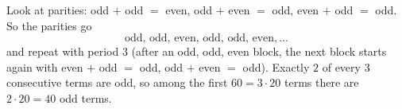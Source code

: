 Look at parities: odd $+$ odd $=$ even, odd $+$ even $=$ odd, even $+$ odd $=$ odd. So the parities go
\[
\text{odd, odd, even, odd, odd, even},\dots
\]
and repeat with period $3$ (after an odd, odd, even block, the next block starts again with even $+$ odd $=$ odd, odd $+$ even $=$ odd). Exactly $2$ of every $3$ consecutive terms are odd, so among the first $60=3\cdot20$ terms there are $2\cdot20=\boxed{40}$ odd terms.
